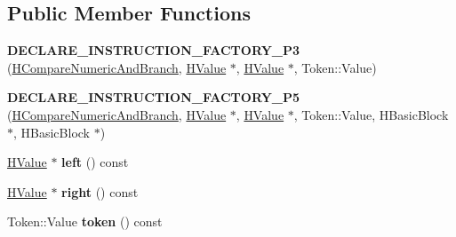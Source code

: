 \subsection*{Public Member Functions}
\begin{DoxyCompactItemize}
\item 
\hypertarget{classv8_1_1internal_1_1_h_compare_numeric_and_branch_a761fd5bcf1b1f6c5315ade0e35d8eec5}{}{\bfseries D\+E\+C\+L\+A\+R\+E\+\_\+\+I\+N\+S\+T\+R\+U\+C\+T\+I\+O\+N\+\_\+\+F\+A\+C\+T\+O\+R\+Y\+\_\+\+P3} (\hyperlink{classv8_1_1internal_1_1_h_compare_numeric_and_branch}{H\+Compare\+Numeric\+And\+Branch}, \hyperlink{classv8_1_1internal_1_1_h_value}{H\+Value} $\ast$, \hyperlink{classv8_1_1internal_1_1_h_value}{H\+Value} $\ast$, Token\+::\+Value)\label{classv8_1_1internal_1_1_h_compare_numeric_and_branch_a761fd5bcf1b1f6c5315ade0e35d8eec5}

\item 
\hypertarget{classv8_1_1internal_1_1_h_compare_numeric_and_branch_a1f4360f44b43462dd3e94aa4bc519ddd}{}{\bfseries D\+E\+C\+L\+A\+R\+E\+\_\+\+I\+N\+S\+T\+R\+U\+C\+T\+I\+O\+N\+\_\+\+F\+A\+C\+T\+O\+R\+Y\+\_\+\+P5} (\hyperlink{classv8_1_1internal_1_1_h_compare_numeric_and_branch}{H\+Compare\+Numeric\+And\+Branch}, \hyperlink{classv8_1_1internal_1_1_h_value}{H\+Value} $\ast$, \hyperlink{classv8_1_1internal_1_1_h_value}{H\+Value} $\ast$, Token\+::\+Value, H\+Basic\+Block $\ast$, H\+Basic\+Block $\ast$)\label{classv8_1_1internal_1_1_h_compare_numeric_and_branch_a1f4360f44b43462dd3e94aa4bc519ddd}

\item 
\hypertarget{classv8_1_1internal_1_1_h_compare_numeric_and_branch_a4a31f85adb3fa865634e6694d31007ec}{}\hyperlink{classv8_1_1internal_1_1_h_value}{H\+Value} $\ast$ {\bfseries left} () const \label{classv8_1_1internal_1_1_h_compare_numeric_and_branch_a4a31f85adb3fa865634e6694d31007ec}

\item 
\hypertarget{classv8_1_1internal_1_1_h_compare_numeric_and_branch_a4a9d4baf1b241c1e109ea24203945111}{}\hyperlink{classv8_1_1internal_1_1_h_value}{H\+Value} $\ast$ {\bfseries right} () const \label{classv8_1_1internal_1_1_h_compare_numeric_and_branch_a4a9d4baf1b241c1e109ea24203945111}

\item 
\hypertarget{classv8_1_1internal_1_1_h_compare_numeric_and_branch_a5035e9844eadd44ebbf630941b1049bc}{}Token\+::\+Value {\bfseries token} () const \label{classv8_1_1internal_1_1_h_compare_numeric_and_branch_a5035e9844eadd44ebbf630941b1049bc}


\end{DoxyCompactItemize}
